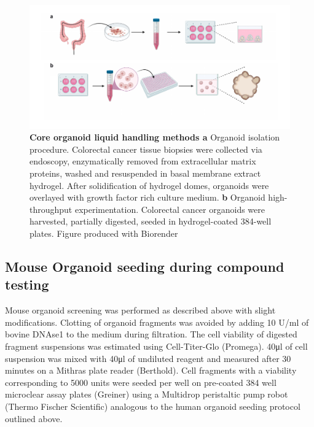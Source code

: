 \begin{flushleft}
\begin{figure}[h!]
\centering
\includegraphics[width=\textwidth,
                height=\textheight,
                keepaspectratio]{figures/promise/pdf/fig_0_1.pdf}
\caption[Core organoid liquid handling methods]{\textbf{Core organoid liquid handling methods a} Organoid isolation procedure. Colorectal cancer tissue biopsies were collected via endoscopy, enzymatically removed from extracellular matrix proteins, washed and resuspended in basal membrane extract hydrogel. After solidification of hydrogel domes, organoids were overlayed with growth factor rich culture medium. \textbf{b} Organoid high-throughput experimentation. Colorectal cancer organoids were harvested, partially digested, seeded in hydrogel-coated 384-well plates. Figure produced with Biorender}
\label{fig_110}
\end{figure}

\subsection{Mouse Organoid seeding during compound testing}
Mouse organoid screening was performed as described above with slight modifications. Clotting of organoid fragments was avoided by adding 10 U/ml of bovine DNAse1 to the medium during filtration. The cell viability of digested fragment suspensions was estimated using Cell-Titer-Glo (Promega). 40μl of cell suspension was mixed with 40μl of undiluted reagent and measured after 30 minutes on a Mithras plate reader (Berthold). Cell fragments with a viability corresponding to 5000 units were seeded per well on pre-coated 384 well microclear assay plates (Greiner) using a Multidrop peristaltic pump robot (Thermo Fischer Scientific) analogous to the human organoid seeding protocol outlined above. 


\end{flushleft}
